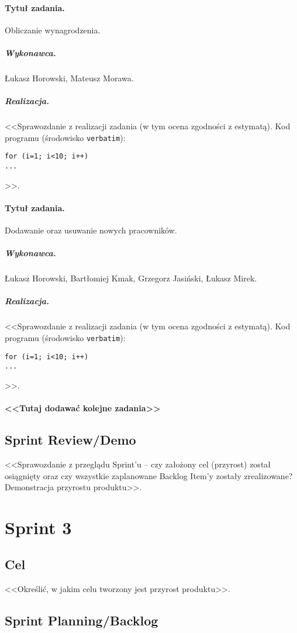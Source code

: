 \documentclass[a4paper]{article}
\begin{document}
\paragraph{Tytuł zadania.} Obliczanie wynagrodzenia.
\subparagraph{Wykonawca.} Łukasz Horowski, Mateusz Morawa.
\subparagraph{Realizacja.} <<Sprawozdanie z realizacji zadania (w tym ocena zgodności z estymatą). Kod programu (środowisko \texttt{verbatim}): \begin{verbatim}
for (i=1; i<10; i++)
...
\end{verbatim}>>.

\paragraph{Tytuł zadania.} Dodawanie oraz usuwanie nowych pracowników.
\subparagraph{Wykonawca.} Łukasz Horowski, Bartłomiej Kmak, Grzegorz Jasiński, Łukasz Mirek.
\subparagraph{Realizacja.} <<Sprawozdanie z realizacji zadania (w tym ocena zgodności z estymatą). Kod programu (środowisko \texttt{verbatim}): \begin{verbatim}
for (i=1; i<10; i++)
...
\end{verbatim}>>.

\paragraph{<<Tutaj dodawać kolejne zadania>>}


\subsection{Sprint Review/Demo}
<<Sprawozdanie z przeglądu Sprint'u -- czy założony cel (przyrost) został osiągnięty oraz czy wszystkie zaplanowane Backlog Item'y zostały zrealizowane? Demonstracja przyrostu produktu>>.

\section{Sprint 3}

\subsection{Cel} <<Określić, w jakim celu tworzony jest przyrost produktu>>.

\subsection{Sprint Planning/Backlog}
\end{document}
